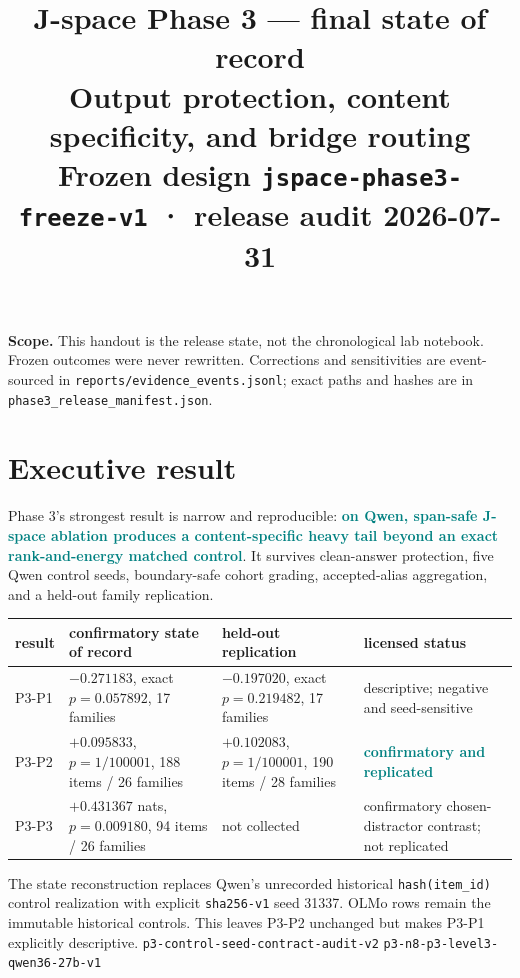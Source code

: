 \documentclass[10pt]{article}
\title{\vspace{-1.3em}J-space Phase 3 --- final state of record\\
\large Output protection, content specificity, and bridge routing\\[3pt]
\normalsize\textcolor{muted}{Frozen design
\texttt{jspace-phase3-freeze-v1} · release audit 2026-07-31}}
\author{}\date{}
\newcommand{\eid}[1]{\textcolor{muted}{\footnotesize\texttt{#1}}}
\newcommand{\good}[1]{\textcolor{teal}{\textbf{#1}}}
\begin{document}
\maketitle
\vspace{-2.8em}

\noindent\textbf{Scope.} This handout is the release state, not the
chronological lab notebook. Frozen outcomes were never rewritten.
Corrections and sensitivities are event-sourced in
\texttt{reports/evidence\_events.jsonl}; exact paths and hashes are in
\texttt{phase3\_release\_manifest.json}.

\section{Executive result}

Phase 3's strongest result is narrow and reproducible:
\good{on Qwen, span-safe J-space ablation produces a content-specific
heavy tail beyond an exact rank-and-energy matched control}. It survives
clean-answer protection, five Qwen control seeds, boundary-safe cohort
grading, accepted-alias aggregation, and a held-out family replication.

\begin{center}\small
\renewcommand{\arraystretch}{1.16}
\begin{tabular}{p{2.15cm}p{4.0cm}p{4.0cm}p{3.1cm}}
\toprule
result & confirmatory state of record & held-out replication & licensed status\\
\midrule
P3-P1 &
$-0.271183$, exact $p=0.057892$,
17 families &
$-0.197020$, exact $p=0.219482$,
17 families &
descriptive; negative and seed-sensitive\\
P3-P2 &
$+0.095833$, $p=1/100001$,
188 items / 26 families &
$+0.102083$, $p=1/100001$,
190 items / 28 families &
\good{confirmatory and replicated}\\
P3-P3 &
$+0.431367$ nats, $p=0.009180$,
94 items / 26 families &
not collected &
confirmatory chosen-distractor contrast; not replicated\\
\bottomrule
\end{tabular}
\end{center}

The state reconstruction replaces Qwen's unrecorded historical
\texttt{hash(item\_id)} control realization with explicit
\texttt{sha256-v1} seed 31337. OLMo rows remain the immutable historical
controls. This leaves P3-P2 unchanged but makes P3-P1 explicitly
descriptive. \eid{p3-control-seed-contract-audit-v2}
\eid{p3-n8-p3-level3-qwen36-27b-v1}
\end{document}

